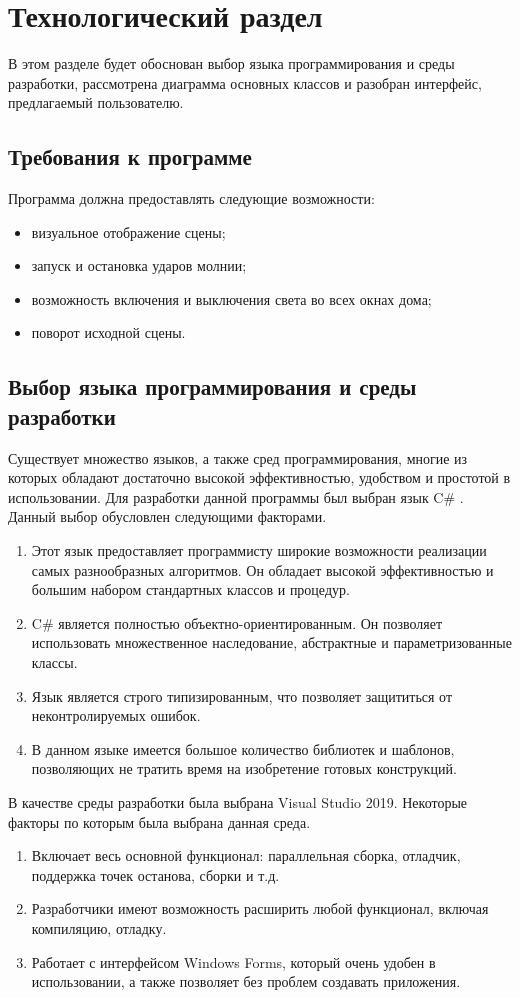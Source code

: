 \chapter{Технологический раздел}
В этом разделе будет обоснован выбор языка программирования и среды разработки, рассмотрена диаграмма основных классов и разобран интерфейс, предлагаемый пользователю.

\section{Требования к программе} 
Программа должна предоставлять следующие возможности:
\begin{itemize}
	\item визуальное отображение сцены;
	\item запуск и остановка ударов молнии;
	\item возможность включения и выключения света во всех окнах дома;
	\item поворот исходной сцены.
\end{itemize}

\section{Выбор языка программирования и среды разработки}
Существует множество языков, а также сред программирования, многие из которых обладают достаточно высокой эффективностью, удобством и простотой в использовании. Для разработки данной программы был выбран язык C\# \cite{csharplang}. Данный выбор обусловлен следующими факторами.

\begin{enumerate}
	\item Этот язык предоставляет программисту широкие возможности реализации самых разнообразных алгоритмов. Он обладает высокой эффективностью и большим набором стандартных классов и процедур.
	\item C\# является полностью объектно-ориентированным. Он позволяет использовать множественное наследование, абстрактные и параметризованные классы.
	\item Язык является строго типизированным, что позволяет защититься от неконтролируемых  ошибок.
	\item В данном языке имеется большое количество библиотек и шаблонов, позволяющих не тратить время на изобретение готовых конструкций.
\end{enumerate}

В качестве среды разработки была выбрана Visual Studio 2019. Некоторые факторы по которым была выбрана данная среда.
\begin{enumerate}
	\item Включает весь основной функционал: параллельная сборка, отладчик, поддержка точек останова, сборки и т.д.
	\item Разработчики имеют возможность расширить любой функционал, включая компиляцию, отладку.
	\item Работает с интерфейсом Windows Forms, который очень удобен в использовании, а также позволяет без проблем создавать приложения.
\end{enumerate}

